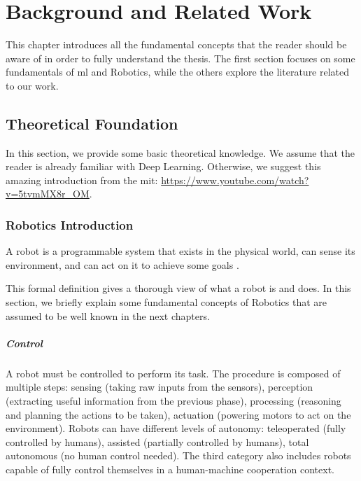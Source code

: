 \chapter{Background and Related Work}
\label{chap:theory}

\glsresetall

This chapter introduces all the fundamental concepts that the reader should be aware of in order to fully understand the thesis. The first section focuses on some fundamentals of \gls{ml} and Robotics, while the others explore the literature related to our work.




\section{Theoretical Foundation}

In this section, we provide some basic theoretical knowledge. We assume that the reader is already familiar with Deep Learning. Otherwise, we suggest this amazing introduction from the \gls{mit}: \url{https://www.youtube.com/watch?v=5tvmMX8r_OM}.


\subsection{Robotics Introduction}
\label{subsec:robot-pose}

A robot is a programmable system that exists in the physical world, can sense its environment, and can act on it to achieve some goals \cite{mataric2007robotics}.

This formal definition gives a thorough view of what a robot is and does. In this section, we briefly explain some fundamental concepts of Robotics that are assumed to be well known in the next chapters.

\paragraph*{Control}
A robot must be controlled to perform its task. The procedure is composed of multiple steps: sensing (taking raw inputs from the sensors), perception (extracting useful information from the previous phase), processing (reasoning and planning the actions to be taken), actuation (powering motors to act on the environment). Robots can have different levels of autonomy: teleoperated (fully controlled by humans), assisted (partially controlled by humans), total autonomous (no human control needed). The third category also includes robots capable of fully control themselves in a human-machine cooperation context.

